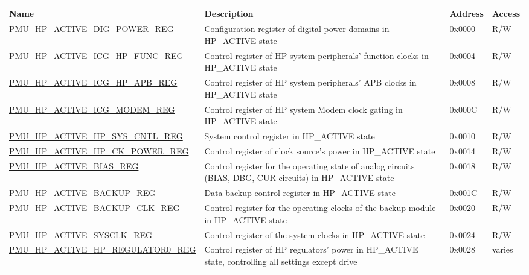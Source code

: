\begin{longtable}{ | l | p{6cm} | p{1.3cm} | p{1.5cm} | }
\hline\rowcolor{lightgray}
\textbf{Name} & \textbf{Description} &  \textbf{Address} & \textbf{Access} \\ \hline
\endhead
\hyperref[regdesc:PMUHPACTIVEDIGPOWERREG]{PMU\_HP\_ACTIVE\_DIG\_POWER\_REG} & Configuration register of digital power domains in HP\_ACTIVE state & 0x0000 & R/W \\ \hline
\hyperref[regdesc:PMUHPACTIVEICGHPFUNCREG]{PMU\_HP\_ACTIVE\_ICG\_HP\_FUNC\_REG} & Control register of HP system peripherals' function clocks in HP\_ACTIVE state & 0x0004 & R/W \\ \hline
\hyperref[regdesc:PMUHPACTIVEICGHPAPBREG]{PMU\_HP\_ACTIVE\_ICG\_HP\_APB\_REG} & Control register of HP system peripherals' APB clocks in HP\_ACTIVE state & 0x0008 & R/W \\ \hline
\hyperref[regdesc:PMUHPACTIVEICGMODEMREG]{PMU\_HP\_ACTIVE\_ICG\_MODEM\_REG} & Control register of HP system Modem clock gating in HP\_ACTIVE state & 0x000C & R/W \\ \hline
\hyperref[regdesc:PMUHPACTIVEHPSYSCNTLREG]{PMU\_HP\_ACTIVE\_HP\_SYS\_CNTL\_REG} & System control register in HP\_ACTIVE state & 0x0010 & R/W \\ \hline
\hyperref[regdesc:PMUHPACTIVEHPCKPOWERREG]{PMU\_HP\_ACTIVE\_HP\_CK\_POWER\_REG} & Control register of clock source's power in HP\_ACTIVE state & 0x0014 & R/W \\ \hline
\hyperref[regdesc:PMUHPACTIVEBIASREG]{PMU\_HP\_ACTIVE\_BIAS\_REG} & Control register for the operating state of analog circuits (BIAS, DBG, CUR circuits) in HP\_ACTIVE state & 0x0018 & R/W \\ \hline
\hyperref[regdesc:PMUHPACTIVEBACKUPREG]{PMU\_HP\_ACTIVE\_BACKUP\_REG} & Data backup control register in HP\_ACTIVE state & 0x001C & R/W \\ \hline
\hyperref[regdesc:PMUHPACTIVEBACKUPCLKREG]{PMU\_HP\_ACTIVE\_BACKUP\_CLK\_REG} & Control register for the operating clocks of the backup module in HP\_ACTIVE state & 0x0020 & R/W \\ \hline
\hyperref[regdesc:PMUHPACTIVESYSCLKREG]{PMU\_HP\_ACTIVE\_SYSCLK\_REG} & Control register of the system clocks in HP\_ACTIVE state & 0x0024 & R/W \\ \hline
\hyperref[regdesc:PMUHPACTIVEHPREGULATOR0REG]{PMU\_HP\_ACTIVE\_HP\_REGULATOR0\_REG} & Control register of HP regulators' power in HP\_ACTIVE state, controlling all settings except drive & 0x0028 & varies \\ \hline

\end{longtable}
